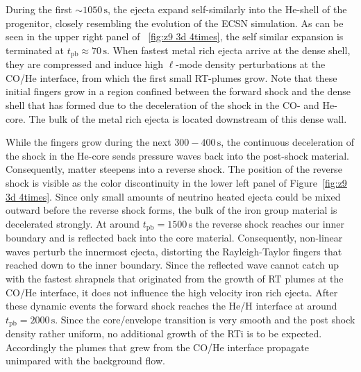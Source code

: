 \documentclass[fleqn,usenatbib]{mnras}
\newcommand{\tpb}{\ensuremath{t_{\text{pb}}}}
\newcommand{\s}{\ensuremath{\text{s}}}
\begin{document}
During the first $\sim 10\mathord{50}\,\s$, the ejecta expand self-similarly into the He-shell of the progenitor, closely resembling the evolution of the ECSN simulation.
As can be seen in the upper right panel of ~\ref{fig:z9 3d 4times}, the self similar expansion is terminated at $t_{\mathrm{pb}}\approx 70\,\text{s}$.
When fastest metal rich ejecta arrive at the dense shell, they are compressed and induce high $\ell$-mode density perturbations at the CO/He interface, from which the first small RT-plumes grow.
Note that these initial fingers grow in a region confined between the forward shock and the dense shell that has formed due to the deceleration of the shock in the CO- and He-core. The bulk of the metal rich ejecta is located downstream of this dense wall.

While the fingers grow during the next $300-400\,\s$, the continuous deceleration of the shock in the He-core sends pressure waves back into the post-shock material. Consequently, matter steepens into a reverse shock. The position of the reverse shock is visible as the color discontinuity in the lower left panel of Figure~\ref{fig:z9 3d 4times}. Since only small amounts of neutrino heated ejecta could be mixed outward before the reverse shock forms, the bulk of the iron group material is decelerated strongly.
At around $\tpb=1500\,\s$ the reverse shock reaches our inner boundary and is reflected back into the core material.
Consequently, non-linear waves perturb the innermost ejecta, distorting the Rayleigh-Taylor fingers that reached down to the inner boundary. Since the reflected wave cannot catch up with the fastest shrapnels that originated from the growth of RT plumes at the CO/He interface, it does not influence the high velocity iron rich ejecta.
After these dynamic events the forward shock reaches the He/H interface at around $\tpb=2000\,\text{s}$. Since the core/envelope transition is very smooth and the post shock density rather uniform, no additional growth of the RTi is to be expected. Accordingly the plumes that grew from the CO/He interface propagate unimpared with the background flow. 
\end{document}
